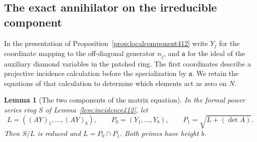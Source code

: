 \documentclass[a4paper,11pt]{article}
\newtheorem{lemma}[proposition]{Lemma}
\theoremstyle{definition}
\theoremstyle{remark}
\numberwithin{equation}{section}
\begin{document}
\subsection{The exact annihilator on the irreducible component}
\label{sec:incidenceannihilator413}

In the presentation of Proposition~\ref{prop:localcomponent412}
write \(Y_j\) for the coordinate mapping to the off-diagonal
generator \(n_j\), and \(\mathfrak a\) for the ideal of the
auxiliary diamond variables in the patched ring. The first
coordinates describe a projective incidence calculation
before the specialization by \(\mathfrak a\). We retain
the equations of that calculation to determine which
elements act as zero on \(N\).

\begin{lemma}[The two components of the matrix equation]\leavevmode
\label{lem:reducedincidence413}
In the formal power series ring \(S\) of
Lemma~\ref{lem:incidence412}, let
\[
         L=((AY)_1,\ldots,(AY)_b),\qquad
         P_0=(Y_1,\ldots,Y_b),\qquad
         P_1=\sqrt{L+(\det A)} .
\]
Then \(S/L\) is reduced and \(L=P_0\cap P_1\). Both primes
have height \(b\).
\end{lemma}
\end{document}
